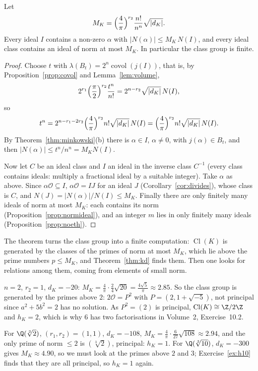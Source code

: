 \begin{theorem}\label{thm:minkbound}
Let
\[
M_K=\Bigl(\frac4\pi\Bigr)^{r_2}\frac{n!}{n^n}\sqrt{|d_K|}.
\]
Every ideal $I$ contains a non-zero $\alpha$ with $|N(\alpha)|\le M_K\,N(I)$, and every ideal class contains an ideal of
norm at most $M_K$. In particular the class group is finite.
\end{theorem}
\begin{proof}
Choose $t$ with $\lambda(B_t)=2^n\operatorname{covol}(j(I))$, that is, by Proposition~\ref{prop:covol} and
Lemma~\ref{lem:volume},
\[
2^{r_1}\Bigl(\frac\pi2\Bigr)^{r_2}\frac{t^n}{n!}=2^{n-r_2}\sqrt{|d_K|}\,N(I),
\]
so
\[
t^n=2^{n-r_1-2r_2}\Bigl(\frac4\pi\Bigr)^{r_2}n!\sqrt{|d_K|}\,N(I)=\Bigl(\frac4\pi\Bigr)^{r_2}n!\sqrt{|d_K|}\,N(I).
\]
By Theorem~\ref{thm:minkowski}(b) there is $\alpha\in I$, $\alpha\ne0$, with $j(\alpha)\in B_t$, and then $|N(\alpha)|
\le t^n/n^n=M_KN(I)$.

Now let $C$ be an ideal class and $I$ an ideal in the inverse class $C^{-1}$ (every class contains ideals: multiply a
fractional ideal by a suitable integer). Take $\alpha$ as above. Since $\alpha\mathcal O\subseteq I$, $\alpha\mathcal O=IJ$
for an ideal $J$ (Corollary~\ref{cor:divides}), whose class is $C$, and $N(J)=|N(\alpha)|/N(I)\le M_K$. Finally there are
only finitely many ideals of norm at most $M_K$: each contains its norm (Proposition~\ref{prop:normideal}), and an
integer $m$ lies in only finitely many ideals (Proposition~\ref{prop:noeth}).
\end{proof}

The theorem turns the class group into a finite computation: $\operatorname{Cl}(K)$ is generated by the classes of the
primes of norm at most $M_K$, which lie above the prime numbers $p\le M_K$, and Theorem~\ref{thm:kd} finds them. Then one
looks for relations among them, coming from elements of small norm.

\begin{example}[{$\Q(\sqrt{-5})$}]
$n=2$, $r_2=1$, $d_K=-20$: $M_K=\frac4\pi\cdot\frac24\sqrt{20}=\frac{4\sqrt5}\pi\approx2.85$. So the class group is
generated by the primes above $2$: $2\mathcal O=P^2$ with $P=(2,1+\sqrt{-5})$, not principal since $a^2+5b^2=2$ has no
solution. As $P^2=(2)$ is principal, $\operatorname{Cl}(K)\cong\Z/2\Z$ and $h_K=2$, which is why $6$ has two factorisations in Volume~2, Exercise~10.2.
\end{example}

\begin{example}
For $\Q(\sqrt[3]2)$, $(r_1,r_2)=(1,1)$, $d_K=-108$, $M_K=\frac4\pi\cdot\frac6{27}\sqrt{108}\approx2.94$, and the only
prime of norm $\le2$ is $(\sqrt[3]2)$, principal: $h_K=1$. For $\Q(\sqrt[3]{10})$, $d_K=-300$ gives $M_K\approx4.90$, so we
must look at the primes above $2$ and $3$; Exercise~\ref{ex:h10} finds that they are all principal, so $h_K=1$ again.
\end{example}

